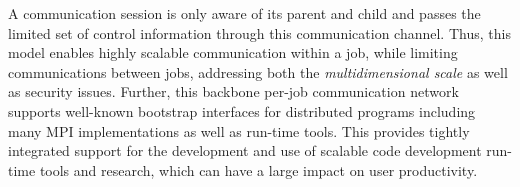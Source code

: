 A communication session is only aware of its parent 
and child and passes the limited set of control information 
through this communication channel. Thus, this model 
enables highly scalable communication within a job, while 
limiting communications between jobs, addressing 
both the {\em multidimensional scale} as well as security issues.
Further, this backbone per-job communication network 
supports well-known bootstrap interfaces 
for distributed programs including many MPI implementations 
as well as run-time tools.  This provides tightly integrated support
for the development and use of scalable code development run-time tools
and research, which can have a large impact on user productivity.
